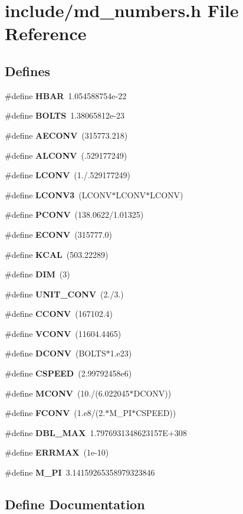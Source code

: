 \section{include/md\_\-numbers.h File Reference}
\label{md__numbers_8h}
\subsection*{Defines}
\begin{CompactItemize}
\item 
\#define {\bf HBAR}~1.054588754e-22
\item 
\#define {\bf BOLTS}~1.38065812e-23
\item 
\#define {\bf AECONV}~(315773.218)
\item 
\#define {\bf ALCONV}~(.529177249)
\item 
\#define {\bf LCONV}~(1./.529177249)
\item 
\#define {\bf LCONV3}~(LCONV$\ast$LCONV$\ast$LCONV)
\item 
\#define {\bf PCONV}~(138.0622/1.01325)
\item 
\#define {\bf ECONV}~(315777.0)
\item 
\#define {\bf KCAL}~(503.22289)
\item 
\#define {\bf DIM}~(3)
\item 
\#define {\bf UNIT\_\-CONV}~(2./3.)
\item 
\#define {\bf CCONV}~(167102.4)
\item 
\#define {\bf VCONV}~(11604.4465)
\item 
\#define {\bf DCONV}~(BOLTS$\ast$1.e23)
\item 
\#define {\bf CSPEED}~(2.99792458e6)
\item 
\#define {\bf MCONV}~(10./(6.022045$\ast$DCONV))
\item 
\#define {\bf FCONV}~(1.e8/(2.$\ast$M\_\-PI$\ast$CSPEED))
\item 
\#define {\bf DBL\_\-MAX}~1.7976931348623157E+308
\item 
\#define {\bf ERRMAX}~(1e-10)
\item 
\#define {\bf M\_\-PI}~3.14159265358979323846
\end{CompactItemize}


\subsection{Define Documentation}
